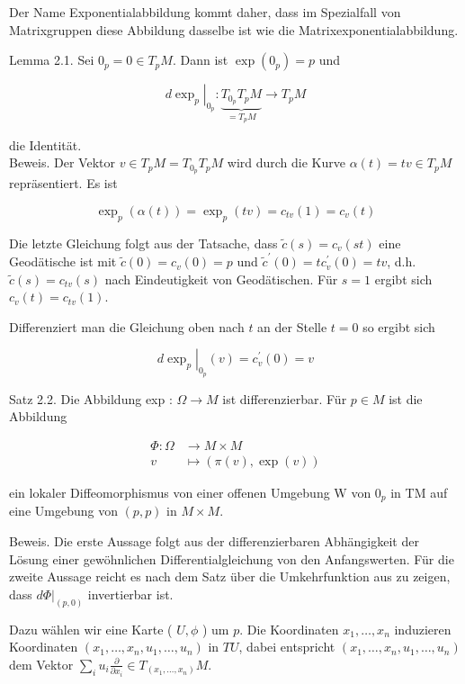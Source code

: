 \documentclass[10pt]{article}
\begin{document}
Der Name Exponentialabbildung kommt daher, dass im Spezialfall von Matrixgruppen diese Abbildung dasselbe ist wie die Matrixexponentialabbildung.

Lemma 2.1. Sei $0_{p}=0 \in T_{p} M$. Dann ist $\exp \left(0_{p}\right)=p$ und

$$
\left.d \exp _{p}\right|_{0_{p}}: \underbrace{T_{0_{p}} T_{p} M}_{=T_{p} M} \rightarrow T_{p} M
$$

die Identität.\\
Beweis. Der Vektor $v \in T_{p} M=T_{0_{p}} T_{p} M$ wird durch die Kurve $\alpha(t)=t v \in T_{p} M$ repräsentiert. Es ist

$$
\exp _{p}(\alpha(t))=\exp _{p}(t v)=c_{t v}(1)=c_{v}(t)
$$

Die letzte Gleichung folgt aus der Tatsache, dass $\tilde{c}(s)=c_{v}(s t)$ eine Geodätische ist mit $\tilde{c}(0)=c_{v}(0)=p$ und $\tilde{c}^{\prime}(0)=t c_{v}^{\prime}(0)=t v$, d.h. $\tilde{c}(s)=c_{t v}(s)$ nach Eindeutigkeit von Geodätischen. Für $s=1$ ergibt sich $c_{v}(t)=c_{t v}(1)$.

Differenziert man die Gleichung oben nach $t$ an der Stelle $t=0$ so ergibt sich

$$
\left.d \exp _{p}\right|_{0_{p}}(v)=c_{v}^{\prime}(0)=v
$$

Satz 2.2. Die Abbildung exp : $\Omega \rightarrow M$ ist differenzierbar. Für $p \in M$ ist die Abbildung

$$
\begin{aligned}
\Phi: \Omega & \rightarrow M \times M \\
v & \mapsto(\pi(v), \exp (v))
\end{aligned}
$$

ein lokaler Diffeomorphismus von einer offenen Umgebung W von $0_{p}$ in TM auf eine Umgebung von $(p, p)$ in $M \times M$.

Beweis. Die erste Aussage folgt aus der differenzierbaren Abhängigkeit der Lösung einer gewöhnlichen Differentialgleichung von den Anfangswerten. Für die zweite Aussage reicht es nach dem Satz über die Umkehrfunktion aus zu zeigen, dass $\left.d \Phi\right|_{(p, 0)}$ invertierbar ist.

Dazu wählen wir eine Karte ( $U, \phi$ ) um $p$. Die Koordinaten $x_{1}, \ldots, x_{n}$ induzieren Koordinaten $\left(x_{1}, \ldots, x_{n}, u_{1}, \ldots, u_{n}\right)$ in $T U$, dabei entspricht $\left(x_{1}, \ldots, x_{n}, u_{1}, \ldots, u_{n}\right)$ dem Vektor $\sum_{i} u_{i} \frac{\partial}{\partial x_{i}} \in T_{\left(x_{1}, \ldots, x_{n}\right)} M$.
\end{document}
